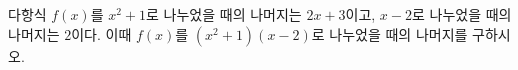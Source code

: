 다항식 $f(x)$를 $x^2+1$로 나누었을 때의 나머지는 $2x+3$이고, $x-2$로 나누었을 때의 나머지는 $2$이다. 이때 $f(x)$를 $(x^2+1)(x-2)$로 나누었을 때의 나머지를 구하시오.
